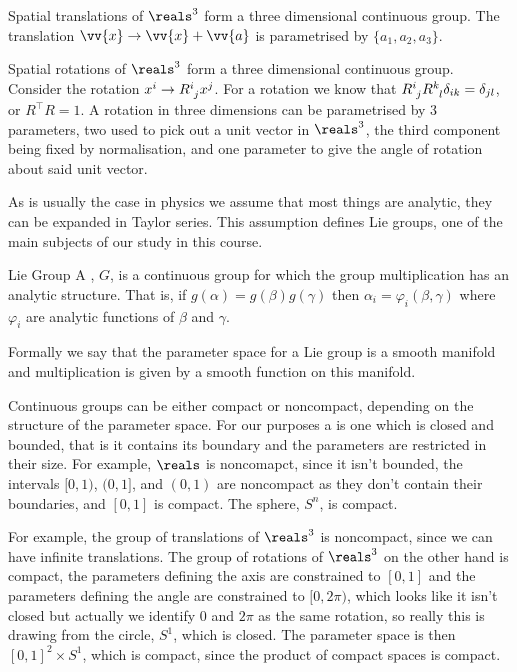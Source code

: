 \documentclass[fleqn]{NotesClass}
\newcommand{\ident}{1}
\newcommand{\sphere}[1][n]{S^{#1}}
\newcommand{\trans}{\top}
\begin{document}
    \begin{exm}{}{}
        Spatial translations of \(\reals^3\) form a three dimensional continuous group.
        The translation \(\vv{x} \to \vv{x} + \vv{a}\) is parametrised by \(\{a_1, a_2, a_3\}\).
        
        Spatial rotations of \(\reals^3\) form a three dimensional continuous group.
        Consider the rotation \(x^i \to \tensor{R}{^i_j}x^j\).
        For a rotation we know that \(\tensor{R}{^i_j}\tensor{R}{^k_l} \delta_{ik} = \delta_{jl}\), or \(R^\trans R = \ident\).
        A rotation in three dimensions can be parametrised by 3 parameters, two used to pick out a unit vector in \(\reals^3\), the third component being fixed by normalisation, and one parameter to give the angle of rotation about said unit vector.
    \end{exm}
    
    As is usually the case in physics we assume that most things are analytic, they can be expanded in Taylor series.
    This assumption defines Lie groups, one of the main subjects of our study in this course.
    \begin{dfn}{Lie Group}{}
        A , \(G\), is a continuous group for which the group multiplication has an analytic structure.
        That is, if \(g(\alpha) = g(\beta)g(\gamma)\) then \(\alpha_i = \varphi_i(\beta, \gamma)\) where \(\varphi_i\) are analytic functions of \(\beta\) and \(\gamma\).
    \end{dfn}
    
    Formally we say that the parameter space for a Lie group is a smooth manifold and multiplication is given by a smooth function on this manifold.
    
    Continuous groups can be either compact or noncompact, depending on the structure of the parameter space.
    For our purposes a  is one which is closed and bounded, that is it contains its boundary and the parameters are restricted in their size.
    For example, \(\reals\) is noncomapct, since it isn't bounded, the intervals \([0, 1)\), \((0, 1]\), and \((0, 1)\) are noncompact as they don't contain their boundaries, and \([0, 1]\) is compact.
    The sphere, \(\sphere\), is compact.
    
    For example, the group of translations of \(\reals^3\) is noncompact, since we can have infinite translations.
    The group of rotations of \(\reals^3\) on the other hand is compact, the parameters defining the axis are constrained to \([0, 1]\) and the parameters defining the angle are constrained to \([0, 2\pi)\), which looks like it isn't closed but actually we identify 0 and \(2\pi\) as the same rotation, so really this is drawing from the circle, \(\sphere[1]\), which is closed.
    The parameter space is then \([0, 1]^2 \times \sphere[1]\), which is compact, since the product of compact spaces is compact.
    
\end{document}
